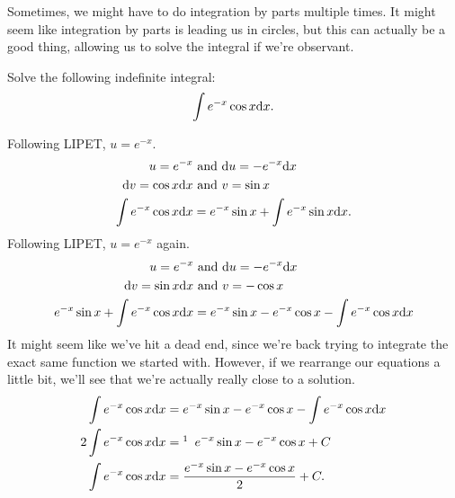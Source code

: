 \noindent
Sometimes, we might have to do integration by parts multiple times.
It might seem like integration by parts is leading us in circles, but this can actually be a good thing, allowing us to solve the integral if we're observant.
\begin{example}
	Solve the following indefinite integral:
	\begin{equation*}
		\int{e^{-x}\cos{x}\mathrm{d} x}.
	\end{equation*}
\end{example}
Following LIPET, $u=e^{-x}$.
\begin{align*}
	u = e^{-x} &\text{ and } \mathrm{d} u = -e^{-x}\mathrm{d} x \\
	\mathrm{d} v = \cos{x}\mathrm{d} x &\text{ and } v = \sin{x} \\
	\int{e^{-x}\cos{x}\mathrm{d} x} &= e^{-x}\sin{x} + \int{e^{-x}\sin{x}\mathrm{d} x}.
\end{align*}
\indent
Following LIPET, $u = e^{-x}$ again.
\begin{align*}
	u = e^{-x} &\text{ and } \mathrm{d} u = -e^{-x}\mathrm{d} x \\
	\mathrm{d} v = \sin{x}\mathrm{d} x &\text{ and } v = -\cos{x} \\
	e^{-x}\sin{x} + \int{e^{-x}\cos{x}\mathrm{d} x} &= e^{-x}\sin{x} - e^{-x}\cos{x} - \int{e^{-x}\cos{x}\mathrm{d} x}
\end{align*}
\indent
It might seem like we've hit a dead end, since we're back trying to integrate the exact same function we started with.
However, if we rearrange our equations a little bit, we'll see that we're actually really close to a solution.
\begin{align*}
	\int{e^{-x}\cos{x}\d{x}} &= e^{-x}\sin{x} - e^{-x}\cos{x} - \int{e^{-x}\cos{x}\d{x}} \\
	2\int{e^{-x}\cos{x}\d{x}} &=\footnotemark\hspace{5pt} e^{-x}\sin{x} - e^{-x}\cos{x} + C \\
	\int{e^{-x}\cos{x}\d{x}} &= \frac{e^{-x}\sin{x} - e^{-x}\cos{x}}{2} + C.
\end{align*}

